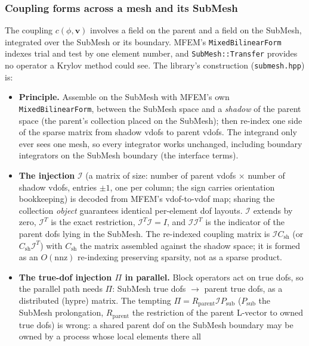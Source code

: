 \documentclass[11pt]{article}
\numberwithin{equation}{section}
\theoremstyle{remark}
\newcommand{\vv}{\mathbf{v}}
\newcommand{\code}[1]{\texttt{#1}}
\begin{document}
\subsubsection{Coupling forms across a mesh and its SubMesh}
\label{sec:submesh}

The coupling $c(\phi,\vv)$ involves a field on the parent and a field on
the SubMesh, integrated over the SubMesh or its boundary. MFEM's
\code{MixedBilinearForm} indexes trial and test by one element number, and
\code{SubMesh::Transfer} provides no operator a Krylov method could see.
The library's construction (\code{submesh.hpp}) is:

\begin{itemize}
\item \textbf{Principle.} Assemble on the SubMesh with MFEM's own
  \code{MixedBilinearForm}, between the SubMesh space and a \emph{shadow}
  of the parent space (the parent's collection placed on the SubMesh); then
  re-index one side of the sparse matrix from shadow vdofs to parent vdofs.
  The integrand only ever sees one mesh, so every integrator works
  unchanged, including boundary integrators on the SubMesh boundary (the
  interface terms).
\item \textbf{The injection} $\mathcal{I}$ (a matrix of size: number of
  parent vdofs $\times$ number of shadow vdofs, entries $\pm1$, one per
  column; the sign carries orientation bookkeeping) is decoded from MFEM's
  vdof-to-vdof map; sharing the collection \emph{object} guarantees
  identical per-element dof layouts. $\mathcal{I}$ extends by zero,
  $\mathcal{I}^T$ is the exact restriction, $\mathcal{I}^T\mathcal{I} = I$,
  and $\mathcal{I}\mathcal{I}^T$ is the indicator of the parent dofs lying
  in the SubMesh. The re-indexed coupling matrix is $\mathcal{I}C_{\mathrm{sh}}$
  (or $C_{\mathrm{sh}}\mathcal{I}^T$) with $C_{\mathrm{sh}}$ the matrix
  assembled against the shadow space; it is formed as an $O(\mathrm{nnz})$
  re-indexing preserving sparsity, not as a sparse product.
\item \textbf{The true-dof injection $\Pi$ in parallel.} Block operators act
  on true dofs, so the parallel path needs $\Pi$: SubMesh true dofs $\to$
  parent true dofs, as a distributed (hypre) matrix. The tempting
  $\Pi = R_{\mathrm{parent}}\mathcal{I}P_{\mathrm{sub}}$ ($P_{\mathrm{sub}}$
  the SubMesh prolongation, $R_{\mathrm{parent}}$ the restriction of the
  parent L-vector to owned true dofs) is wrong: a shared parent dof on the
  SubMesh boundary may be owned by a process whose local elements there all

\end{itemize}
\end{document}
